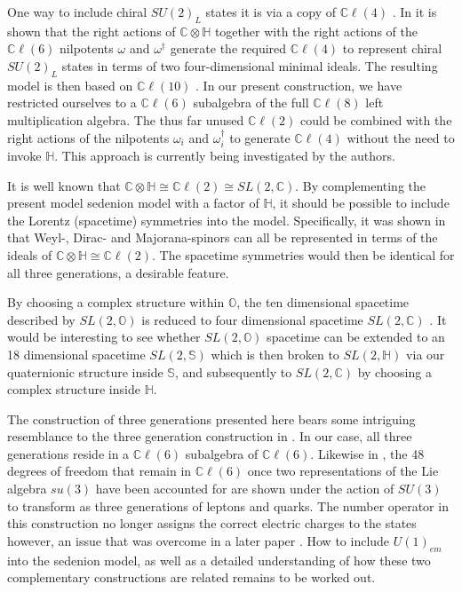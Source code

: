 \documentclass{article}
\newcommand{\bb}[1]{\mathbb{#1}}
\newcommand{\CCl}{\mathbb{C}\ell}
\begin{document}
One way to include chiral $SU(2)_L$ states it is via a copy of $\bb{C}\ell(4)$ \cite{furey2018demonstration}. In \cite{furey2016standard} it is shown that the right actions of $\bb{C}\otimes\bb{H}$ together with the right actions of the $\bb{C}\ell(6)$ nilpotents $\omega$ and $\omega^{\dagger}$ generate the required $\bb{C}\ell(4)$ to represent chiral $SU(2)_L$ states in terms of two four-dimensional minimal ideals. The resulting model is then based on $\bb{C}\ell(10)$ \cite{furey20183,gresnigt2020standard,todorov2023octonion}. In our present construction, we have restricted ourselves to a $\bb{C}\ell(6)$ subalgebra of the full $\bb{C}\ell(8)$ left multiplication algebra. The thus far unused $\bb{C}\ell(2)$ could be combined with the right actions of the nilpotents $\omega_i$ and $\omega^{\dagger}_i$ to generate $\bb{C}\ell(4)$ without the need to invoke $\bb{H}$. This approach is currently being investigated by the authors.

It is well known that $\bb{C}\otimes\bb{H} \cong \CCl(2) \cong SL(2,\bb{C})$. By complementing the present model sedenion model with a factor of $\bb{H}$, it should be possible to include the Lorentz (spacetime) symmetries into the model. Specifically, it was shown in \cite{furey2016standard} that Weyl-, Dirac- and Majorana-spinors can all be represented in terms of the ideals of $\bb{C} \otimes \bb{H}\cong \CCl(2)$. The spacetime symmetries would then be identical for all three generations, a desirable feature.

By choosing a complex structure within $\bb{O}$, the ten dimensional spacetime described by $SL(2,\bb{O})$ is reduced to four dimensional spacetime $SL(2,\bb{C})$ \cite{manogue1999dimensional,dray2015geometry}. It would be interesting to see whether $SL(2,\bb{O})$ spacetime can be extended to an 18 dimensional spacetime $SL(2,\bb{S})$ which is then broken to $SL(2,\bb{H})$ via our quaternionic structure inside $\bb{S}$, and subsequently to $SL(2,\bb{C})$ by choosing a complex structure inside $\bb{H}$. 

The construction of three generations presented here bears some intriguing resemblance to the three generation construction in \cite{furey2014generations,furey2018three}. In our case, all three generations reside in a $\bb{C}\ell(6)$ subalgebra of $\bb{C}\ell(6)$. Likewise in \cite{furey2014generations}, the 48 degrees of freedom that remain in $\bb{C}\ell(6)$ once two representations of the Lie algebra $su(3)$ have been accounted for are shown under the action of $SU(3)$ to transform as three generations of leptons and quarks. The number operator in this construction no longer assigns the correct electric charges to the states however, an issue that was overcome in a later paper \cite{furey2018three}. How to include $U(1)_{em}$ into the sedenion model, as well as a detailed understanding of how these two complementary constructions are related remains to be worked out.
\end{document}
